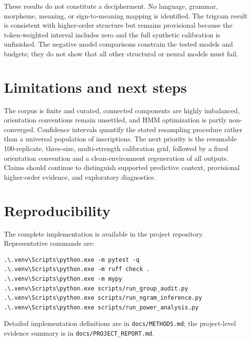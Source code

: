 \documentclass[11pt]{article}
\begin{document}
These results do not constitute a decipherment. No language, grammar, morpheme, meaning, or sign-to-meaning mapping is identified. The trigram result is consistent with higher-order structure but remains provisional because the token-weighted interval includes zero and the full synthetic calibration is unfinished. The negative model comparisons constrain the tested models and budgets; they do not show that all other structural or neural models must fail.

\section{Limitations and next steps}
The corpus is finite and curated, connected components are highly imbalanced, orientation conventions remain unsettled, and HMM optimization is partly non-converged. Confidence intervals quantify the stated resampling procedure rather than a universal population of inscriptions. The next priority is the resumable 100-replicate, three-size, multi-strength calibration grid, followed by a fixed orientation convention and a clean-environment regeneration of all outputs. Claims should continue to distinguish supported predictive context, provisional higher-order evidence, and exploratory diagnostics.

\section{Reproducibility}
The complete implementation is available in the project repository. Representative commands are:
\begin{verbatim}
.\.venv\Scripts\python.exe -m pytest -q
.\.venv\Scripts\python.exe -m ruff check .
.\.venv\Scripts\python.exe -m mypy
.\.venv\Scripts\python.exe scripts/run_group_audit.py
.\.venv\Scripts\python.exe scripts/run_ngram_inference.py
.\.venv\Scripts\python.exe scripts/run_power_analysis.py
\end{verbatim}
Detailed implementation definitions are in \texttt{docs/METHODS.md}; the project-level evidence summary is in \texttt{docs/PROJECT\_REPORT.md}.
\end{document}

